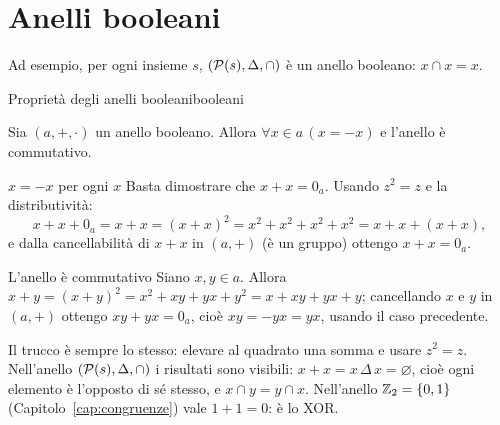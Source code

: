 \section{Anelli booleani}\label{sec:booleani}


Ad esempio, per ogni insieme $s$, $(\mathcal{P}(s), \Delta, \cap)$ è un anello booleano: $x \cap x = x$.

\begin{concetto}
\begin{Teorema}{Proprietà degli anelli booleani}{booleani}
    \begin{prerequisiti}
    \end{prerequisiti}
    Sia $(a, +, \cdot)$ un anello booleano. Allora $\forall x \in a\,(x = -x)$ e l'anello è commutativo.
\end{Teorema}
\begin{dimostrazione}
    \begin{caso}{$x = -x$ per ogni $x$}
        Basta dimostrare che $x + x = 0_a$. Usando $z^2 = z$ e la distributività:
        \[ x + x + 0_a = x + x = (x + x)^2 = x^2 + x^2 + x^2 + x^2 = x + x + (x + x), \]
        e dalla cancellabilità di $x + x$ in $(a, +)$ (è un gruppo) ottengo $x + x = 0_a$.
    \end{caso}
    \begin{caso}{L'anello è commutativo}
        Siano $x, y \in a$. Allora $x + y = (x + y)^2 = x^2 + xy + yx + y^2 = x + xy + yx + y$; cancellando $x$ e $y$ in $(a, +)$ ottengo
        $xy + yx = 0_a$, cioè $xy = -yx = yx$, usando il caso precedente.
    \end{caso}
\end{dimostrazione}
\end{concetto}

\begin{spiegazione}
    Il trucco è sempre lo stesso: elevare al quadrato una somma e usare $z^2 = z$. Nell'anello $(\mathcal{P}(s), \Delta, \cap)$ i risultati sono visibili: $x + x = x \,\Delta\, x = \varnothing$, cioè
    ogni elemento è l'opposto di sé stesso, e $x \cap y = y \cap x$. Nell'anello $\mathbb{Z}_2 = \{0, 1\}$ (Capitolo~\ref{cap:congruenze}) vale $1 + 1 = 0$: è lo XOR.
\end{spiegazione}

